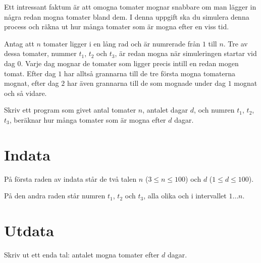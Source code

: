 Ett intressant faktum är att omogna tomater mognar snabbare om man lägger in några redan mogna tomater bland dem.
I denna uppgift ska du simulera denna process och räkna ut hur många tomater som är mogna efter en viss tid.

Antag att $n$ tomater ligger i en lång rad och är numrerade från $1$ till $n$.
Tre av dessa tomater, nummer $t_1$, $t_2$ och $t_3$, är redan mogna när simuleringen startar vid dag $0$.
Varje dag mognar de tomater som ligger precis intill en redan mogen tomat.
Efter dag $1$ har alltså grannarna till de tre första mogna tomaterna mognat, efter dag $2$ har även grannarna till de som mognade under dag $1$ mognat och så vidare.

Skriv ett program som givet antal tomater $n$, antalet dagar $d$, och numren $t_1$, $t_2$, $t_3$, beräknar hur många tomater som är mogna efter $d$ dagar.

\section*{Indata}
På första raden av indata står de två talen $n$ ($3 \le n \le 100$) och $d$ ($1 \le d \le 100$).

På den andra raden står numren $t_1$, $t_2$ och $t_3$, alla olika och i intervallet $1 \dots n$.

\section*{Utdata}
Skriv ut ett enda tal: antalet mogna tomater efter $d$ dagar.
